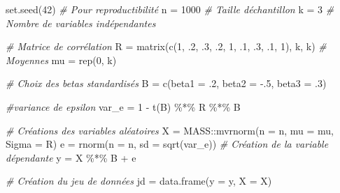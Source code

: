 \documentclass[
]{book}
\newenvironment{Shaded}{}{}
\newcommand{\AttributeTok}[1]{#1}
\newcommand{\CommentTok}[1]{\textit{#1}}
\newcommand{\DecValTok}[1]{#1}
\newcommand{\FunctionTok}[1]{#1}
\newcommand{\NormalTok}[1]{#1}
\newcommand{\OtherTok}[1]{#1}
\newcommand{\SpecialCharTok}[1]{#1}
\begin{document}
\begin{Shaded}
\begin{Highlighting}[]
\FunctionTok{set.seed}\NormalTok{(}\DecValTok{42}\NormalTok{)  }\CommentTok{\# Pour reproductibilité}
\NormalTok{n }\OtherTok{=} \DecValTok{1000}      \CommentTok{\# Taille d\textquotesingle{}échantillon}
\NormalTok{k }\OtherTok{=} \DecValTok{3}         \CommentTok{\# Nombre de variables indépendantes}

\CommentTok{\# Matrice de corrélation}
\NormalTok{R }\OtherTok{=} \FunctionTok{matrix}\NormalTok{(}\FunctionTok{c}\NormalTok{(}\DecValTok{1}\NormalTok{, .}\DecValTok{2}\NormalTok{, .}\DecValTok{3}\NormalTok{,}
\NormalTok{             .}\DecValTok{2}\NormalTok{, }\DecValTok{1}\NormalTok{, .}\DecValTok{1}\NormalTok{,}
\NormalTok{             .}\DecValTok{3}\NormalTok{, .}\DecValTok{1}\NormalTok{, }\DecValTok{1}\NormalTok{), k, k)}
\CommentTok{\# Moyennes}
\NormalTok{mu }\OtherTok{=} \FunctionTok{rep}\NormalTok{(}\DecValTok{0}\NormalTok{, k)}

\CommentTok{\# Choix des betas standardisés}
\NormalTok{B }\OtherTok{=} \FunctionTok{c}\NormalTok{(}\AttributeTok{beta1 =}\NormalTok{ .}\DecValTok{2}\NormalTok{, }\AttributeTok{beta2 =} \SpecialCharTok{{-}}\NormalTok{.}\DecValTok{5}\NormalTok{, }\AttributeTok{beta3 =}\NormalTok{ .}\DecValTok{3}\NormalTok{)}

\CommentTok{\#variance de epsilon}
\NormalTok{var\_e }\OtherTok{=} \DecValTok{1} \SpecialCharTok{{-}} \FunctionTok{t}\NormalTok{(B) }\SpecialCharTok{\%*\%}\NormalTok{ R }\SpecialCharTok{\%*\%}\NormalTok{ B}

\CommentTok{\# Créations des variables aléatoires}
\NormalTok{X }\OtherTok{=}\NormalTok{ MASS}\SpecialCharTok{::}\FunctionTok{mvrnorm}\NormalTok{(}\AttributeTok{n =}\NormalTok{ n, }\AttributeTok{mu =}\NormalTok{ mu, }\AttributeTok{Sigma =}\NormalTok{ R)}
\NormalTok{e }\OtherTok{=} \FunctionTok{rnorm}\NormalTok{(}\AttributeTok{n =}\NormalTok{ n, }\AttributeTok{sd =} \FunctionTok{sqrt}\NormalTok{(var\_e))}
\CommentTok{\# Création de la variable dépendante}
\NormalTok{y }\OtherTok{=}\NormalTok{ X }\SpecialCharTok{\%*\%}\NormalTok{ B }\SpecialCharTok{+}\NormalTok{ e}

\CommentTok{\# Création du jeu de données}
\NormalTok{jd }\OtherTok{=} \FunctionTok{data.frame}\NormalTok{(}\AttributeTok{y =}\NormalTok{ y, }\AttributeTok{X =}\NormalTok{ X)}


\end{Highlighting}
\end{Shaded}
\end{document}
